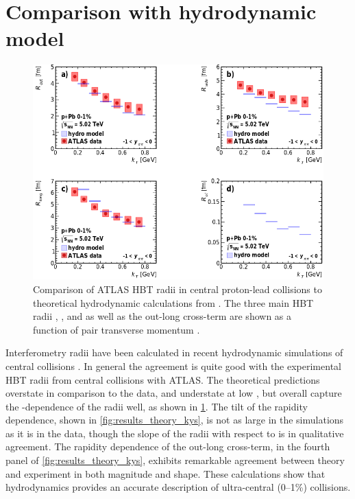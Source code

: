 \FloatBarrier
\section{Comparison with hydrodynamic model}

\begin{figure}[t]
\centering
\includegraphics[width=\linewidth]{theory_bozek_kt.png}
\caption{Comparison of ATLAS HBT radii in central proton-lead collisions to theoretical hydrodynamic calculations from . The three main HBT radii \Rout, \Rside, and \Rlong as well as the out-long cross-term \Rol are shown as a function of pair transverse momentum \kt.}
\label{fig:results_theory_kt}
\end{figure}

Interferometry radii have been calculated in recent hydrodynamic simulations of central \pPb collisions \cite{Bozek:2017bwp}.
In general the agreement is quite good with the experimental HBT radii from central collisions with ATLAS.
The theoretical predictions overstate \Rside in comparison to the data, and understate \Rlong at low \kt, but overall capture the \kt-dependence of the radii well, as shown in \cref{fig:results_theory_kt}.
The tilt of the rapidity dependence, shown in \cref{fig:results_theory_kys}, is not as large in the simulations as it is in the data, though the slope of the radii with respect to \kys is in qualitative agreement.
The rapidity dependence of the out-long cross-term, in the fourth panel of \cref{fig:results_theory_kys}, exhibits remarkable agreement between theory and experiment in both magnitude and shape.
These calculations show that hydrodynamics provides an accurate description of ultra-central (0--1\%) \pPb collisions.

